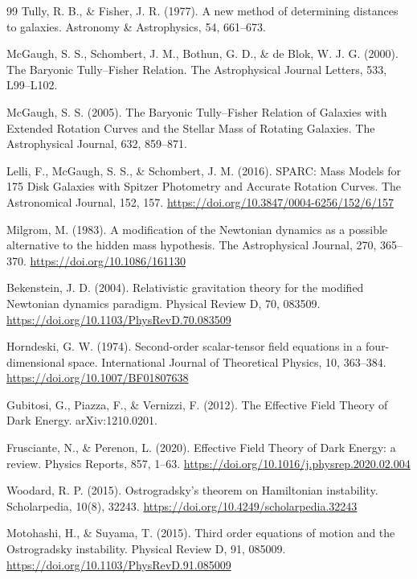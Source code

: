 \documentclass[12pt,a4paper]{article}
\begin{document}
\begin{thebibliography}{99}
		Tully, R. B., \& Fisher, J. R. (1977). A new method of determining distances to galaxies. Astronomy \& Astrophysics, 54, 661–673.
		
		McGaugh, S. S., Schombert, J. M., Bothun, G. D., \& de Blok, W. J. G. (2000). The Baryonic Tully–Fisher Relation. The Astrophysical Journal Letters, 533, L99–L102.
		
		McGaugh, S. S. (2005). The Baryonic Tully–Fisher Relation of Galaxies with Extended Rotation Curves and the Stellar Mass of Rotating Galaxies. The Astrophysical Journal, 632, 859–871.
		
		Lelli, F., McGaugh, S. S., \& Schombert, J. M. (2016). SPARC: Mass Models for 175 Disk Galaxies with Spitzer Photometry and Accurate Rotation Curves. The Astronomical Journal, 152, 157. \url{https://doi.org/10.3847/0004-6256/152/6/157}
		
		Milgrom, M. (1983). A modification of the Newtonian dynamics as a possible alternative to the hidden mass hypothesis. The Astrophysical Journal, 270, 365–370. \url{https://doi.org/10.1086/161130}
		
		Bekenstein, J. D. (2004). Relativistic gravitation theory for the modified Newtonian dynamics paradigm. Physical Review D, 70, 083509. \url{https://doi.org/10.1103/PhysRevD.70.083509}
		
		Horndeski, G. W. (1974). Second-order scalar-tensor field equations in a four-dimensional space. International Journal of Theoretical Physics, 10, 363–384. \url{https://doi.org/10.1007/BF01807638}
		
		Gubitosi, G., Piazza, F., \& Vernizzi, F. (2012). The Effective Field Theory of Dark Energy. arXiv:1210.0201.
		
		Frusciante, N., \& Perenon, L. (2020). Effective Field Theory of Dark Energy: a review. Physics Reports, 857, 1–63. \url{https://doi.org/10.1016/j.physrep.2020.02.004}
		
		Woodard, R. P. (2015). Ostrogradsky’s theorem on Hamiltonian instability. Scholarpedia, 10(8), 32243. \url{https://doi.org/10.4249/scholarpedia.32243}
		
		Motohashi, H., \& Suyama, T. (2015). Third order equations of motion and the Ostrogradsky instability. Physical Review D, 91, 085009. \url{https://doi.org/10.1103/PhysRevD.91.085009}
		

\end{thebibliography}
\end{document}
